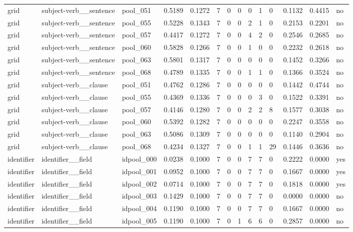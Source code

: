 \begin{table}[t]
{\begin{tabular}{llllllllllllll}
grid & subject-verb\_\_sentence & pool\_051 & 0.5189 & 0.1272 & 7 & 0 & 0 & 0 & 1 & 0 & 0.1132 & 0.4415 & no \\
grid & subject-verb\_\_sentence & pool\_055 & 0.5228 & 0.1343 & 7 & 0 & 0 & 2 & 1 & 0 & 0.2153 & 0.2201 & no \\
grid & subject-verb\_\_sentence & pool\_057 & 0.4417 & 0.1272 & 7 & 0 & 0 & 4 & 2 & 0 & 0.2546 & 0.2685 & no \\
grid & subject-verb\_\_sentence & pool\_060 & 0.5828 & 0.1266 & 7 & 0 & 0 & 1 & 0 & 0 & 0.2232 & 0.2618 & no \\
grid & subject-verb\_\_sentence & pool\_063 & 0.5801 & 0.1317 & 7 & 0 & 0 & 0 & 0 & 0 & 0.1452 & 0.3266 & no \\
grid & subject-verb\_\_sentence & pool\_068 & 0.4789 & 0.1335 & 7 & 0 & 0 & 1 & 1 & 0 & 0.1366 & 0.3524 & no \\
grid & subject-verb\_\_clause & pool\_051 & 0.4762 & 0.1286 & 7 & 0 & 0 & 0 & 0 & 0 & 0.1442 & 0.4744 & no \\
grid & subject-verb\_\_clause & pool\_055 & 0.4369 & 0.1336 & 7 & 0 & 0 & 0 & 3 & 0 & 0.1522 & 0.3391 & no \\
grid & subject-verb\_\_clause & pool\_057 & 0.4146 & 0.1280 & 7 & 0 & 0 & 2 & 2 & 8 & 0.1577 & 0.3038 & no \\
grid & subject-verb\_\_clause & pool\_060 & 0.5392 & 0.1282 & 7 & 0 & 0 & 0 & 0 & 0 & 0.2247 & 0.3558 & no \\
grid & subject-verb\_\_clause & pool\_063 & 0.5086 & 0.1309 & 7 & 0 & 0 & 0 & 0 & 0 & 0.1140 & 0.2904 & no \\
grid & subject-verb\_\_clause & pool\_068 & 0.4234 & 0.1327 & 7 & 0 & 0 & 1 & 1 & 29 & 0.1446 & 0.3636 & no \\
identifier & identifier\_\_field & idpool\_000 & 0.0238 & 0.1000 & 7 & 0 & 0 & 7 & 7 & 0 & 0.2222 & 0.0000 & yes \\
identifier & identifier\_\_field & idpool\_001 & 0.0952 & 0.1000 & 7 & 0 & 0 & 7 & 7 & 0 & 0.1667 & 0.0000 & yes \\
identifier & identifier\_\_field & idpool\_002 & 0.0714 & 0.1000 & 7 & 0 & 0 & 7 & 7 & 0 & 0.1818 & 0.0000 & yes \\
identifier & identifier\_\_field & idpool\_003 & 0.1429 & 0.1000 & 7 & 0 & 0 & 7 & 7 & 0 & 0.0000 & 0.0000 & no \\
identifier & identifier\_\_field & idpool\_004 & 0.1190 & 0.1000 & 7 & 0 & 0 & 7 & 7 & 0 & 0.1667 & 0.0000 & no \\
identifier & identifier\_\_field & idpool\_005 & 0.1190 & 0.1000 & 7 & 0 & 1 & 6 & 6 & 0 & 0.2857 & 0.0000 & no \\

\end{tabular}}
\end{table}
